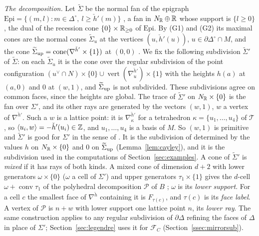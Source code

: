 \emph{The decomposition.} Let $\widetilde\Sigma$ be the normal fan of the epigraph
$\mathrm{Epi}=\{(m,l):m\in\Delta^\circ,\ l\ge\check h'(m)\}$ \cite[Prop.~3.5, 3.7]{Gross2005}, a fan in $N_\mathbb R\oplus\mathbb R$
whose support is $\{l\ge0\}$, the dual of the recession cone $\{0\}\times\mathbb R_{\ge0}$ of $\mathrm{Epi}$. By (G1) and (G2) its maximal cones are the normal cones $\widetilde\Sigma_u$ at the vertices
$(u,\check h'(u))$, $u\in\partial\Delta^\circ\cap M$, and the cone $\widetilde\Sigma_{\rm up}=\operatorname{cone}(\nabla^{\check h'}\times\{1\})$
at $(0,0)$ \cite[Prop.~3.7]{Gross2005}. We fix the following subdivision $\widetilde\Sigma'$ of $\widetilde\Sigma$: on each
$\widetilde\Sigma_u$ it is the cone over the regular subdivision of the point configuration
$(u^\vee\cap N)\times\{0\}\cup\operatorname{vert}(\nabla^{\check h'}_u)\times\{1\}$ with the heights $h(a)$ at $(a,0)$ and $0$ at
$(w,1)$, and $\widetilde\Sigma_{\rm up}$ is not subdivided. These subdivisions agree on common faces, since the heights are
global. The trace of $\widetilde\Sigma'$ on $N_\mathbb R\times\{0\}$ is the fan over $\Sigma'$, and its other rays are generated by
the vectors $(w,1)$, $w$ a vertex of $\nabla^{\check h'}$. Such a $w$ is a lattice point: it is $\nabla^{\check h'}_\kappa$ for a
tetrahedron $\kappa=\{u_1,\dots,u_4\}$ of $\mathcal T$, so $\langle u_i,w\rangle=-\check h'(u_i)\in\mathbb Z$, and $u_1,\dots,u_4$ is a
basis of $M$. So $(w,1)$ is primitive and $\widetilde\Sigma'$ is good for $\Sigma'$ in the sense of \cite[Def.~3.8]{Gross2005}.
It is the subdivision of \cite[Rem.~3.18]{Gross2005} determined by the values $h$ on $N_\mathbb R\times\{0\}$ and $0$ on
$\widetilde\Sigma_{\rm up}$ (Lemma~\ref{lem:cayley}), and it is the subdivision used in the computations of
Section~\ref{sec:examples}. A cone of $\widetilde\Sigma'$ is \emph{mixed} if it has rays of both kinds. A mixed cone of
dimension $d+2$ with lower generators $\omega\times\{0\}$ ($\omega$ a cell of $\Sigma'$) and upper generators
$\tau_1\times\{1\}$ gives the $d$-cell $\omega+\operatorname{conv}\tau_1$ of the polyhedral decomposition $\mathscr P$ of $B$
\cite[Def.~3.13, Obs.~3.9]{Gross2005}; $\omega$ is its \emph{lower support}. For a cell $c$ the smallest face of
$\nabla^{\check h}$ containing it is $F_{\tau(c)}$, and $\tau(c)$ is its \emph{face label}. A vertex of $\mathscr P$ is $n+w$ with
lower support one lattice point $n$, its \emph{lower ray}. The same construction applies to any regular subdivision of
$\partial\Delta$ refining the faces of $\Delta$ in place of $\Sigma'$; Section~\ref{sec:legendre} uses it for $\mathcal F_C$
(Section~\ref{ssec:mirrorsub}).

